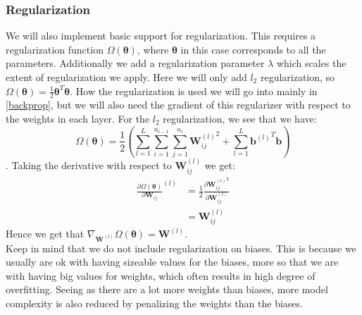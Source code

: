 \documentclass{article}
\begin{document}
\subsubsection{Regularization}
We will also implement basic support for regularization. This requires a
regularization function $\Omega(\bm{\theta})$, where $\bm{\theta}$ in this case
corresponds to all the parameters. Additionally we add a regularization parameter
$\lambda$ which scales the extent of regularization we apply. Here we will only
add $l_2$ regularization, so $\Omega(\bm{\theta}) = \frac{1}{2}\bm{\theta}^T
      \bm{\theta}$. How the regularization is used we will go into mainly in
\ref{backprop}, but we will also need the gradient of this regularizer with
respect to the weights in each layer. For the $l_2$ regularization, we see that we have:
$$\Omega(\bm{\theta}) = \frac{1}{2} \left( \sum_{l = 1}^{L} \sum_{i = 1}^{n_{i-1}} \sum_{j = 1}^{n_i} {\bm{W}_{i j}^{(l)}}^2 + \sum_{l = 1}^{L} {\bm{b}^{(l)}}^T \bm{b} \right)$$.
Taking the derivative with respect to $\bm{W}_{i j}^{(l)}$ we get:
\begin{align*}
      \frac{\partial \Omega(\bm{\theta})}{\partial \bm{W}_{i j}}^{(l)} & = \frac{1}{2} \frac{\partial {\bm{W}_{i j}^{(l)}}^2}{\partial \bm{W}_{i j}^{(l)}} \\
                                                                       & = \bm{W}_{i j}^{(l)}
\end{align*}
Hence we get that $\nabla_{\bm{W}^{(l)}} \Omega(\bm{\theta}) = \bm{W}^{(l)}$.\\
Keep in mind that we do not include regularization on biases.  This is because
we usually are ok with having sizeable values for the biases, more so that we
are with having big values for weights, which often results in high degree of
overfitting. Seeing as there are a lot more weights than biases, more model
complexity is also reduced by penalizing the weights than the biases.
\end{document}
